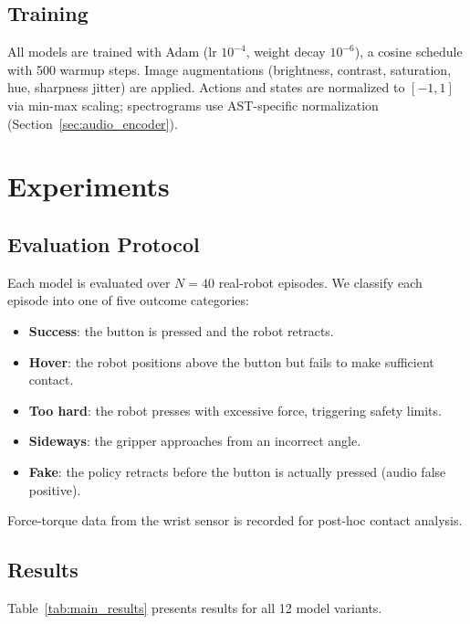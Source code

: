 \documentclass[conference]{IEEEtran}
\begin{document}
\subsection{Training}

All models are trained with Adam (lr $10^{-4}$, weight decay $10^{-6}$), a cosine schedule with 500 warmup steps.
Image augmentations (brightness, contrast, saturation, hue, sharpness jitter) are applied.
Actions and states are normalized to $[-1, 1]$ via min-max scaling; spectrograms use AST-specific normalization (Section~\ref{sec:audio_encoder}).

\section{Experiments}

\subsection{Evaluation Protocol}

Each model is evaluated over $N{=}40$ real-robot episodes.
We classify each episode into one of five outcome categories:
\begin{itemize}
    \item \textbf{Success}: the button is pressed and the robot retracts.
    \item \textbf{Hover}: the robot positions above the button but fails to make sufficient contact.
    \item \textbf{Too hard}: the robot presses with excessive force, triggering safety limits.
    \item \textbf{Sideways}: the gripper approaches from an incorrect angle.
    \item \textbf{Fake}: the policy retracts before the button is actually pressed (audio false positive).
\end{itemize}

Force-torque data from the wrist sensor is recorded for post-hoc contact analysis.

\subsection{Results}

Table~\ref{tab:main_results} presents results for all 12 model variants.
\end{document}
